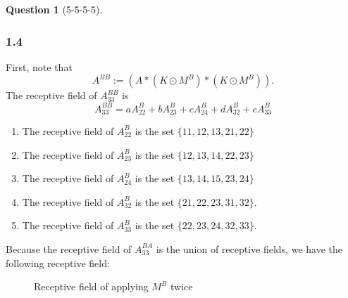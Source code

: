 \documentclass[12pt]{article}
\theoremstyle{definition}
\newtheorem{exercise}{Question}%
\begin{document}
\begin{exercise}[5-5-5-5]
{  \subsubsection*{1.4}
  First, note that
    \begin{equation}
      A^{BB} := (A * (K \odot M^{B}) * (K \odot M^{B})).
      \label{aaa}
    \end{equation}
    The receptive field of $A_{33}^{BB}$ is
    \begin{equation}
      A^{BB}_{33} = aA^{B}_{22} +  b A^{B}_{23} + c A^{B}_{24} + d A^{B}_{32} + e A^{B}_{33}
    \label{eqaa}
    \end{equation}
    \begin{enumerate}
        \item The receptive field of  $A^{B}_{22}$ is the set
            $\{11, 12 ,13, 21, 22\}$
        \item The receptive field of  $A^{B}_{23}$ is the set
            $\{12, 13 ,14, 22, 23\}$
        \item The receptive field of  $A^{B}_{24}$ is the set
            $\{13, 14 ,15, 23, 24\}$
        \item The receptive field of  $A^{B}_{32}$ is the set
            $\{21, 22, 23, 31, 32\}$.
        \item The receptive field of  $A^{B}_{33}$ is the set
            $\{22, 23, 24, 32, 33\}$.
    \end{enumerate}
    Because the receptive field of $A^{BA}_{33}$ is the union of receptive fields, we have the
    following receptive field:
    \begin{figure}[h]
    \centering
    \caption{Receptive field of applying $M^{B}$ twice}
    \label{fig:pixcnn5}
    \end{figure}
}
\end{exercise}
\end{document}
